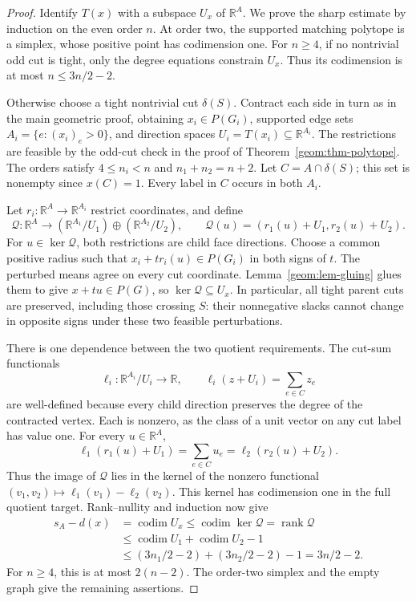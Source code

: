 \begin{proof}
Identify \(T(x)\) with a subspace \(U_x\) of \(\mathbb R^A\).
We prove the sharp estimate by induction on the even order \(n\).
At order two, the supported matching polytope is a simplex, whose
positive point has codimension one. For \(n\ge4\), if no nontrivial
odd cut is tight, only the degree equations constrain \(U_x\).
Thus its codimension is at most \(n\le3n/2-2\).

Otherwise choose a tight nontrivial cut \(\delta(S)\). Contract
each side in turn as in the main geometric proof, obtaining
\(x_i\in P(G_i)\), supported edge sets
\(A_i=\{e:(x_i)_e>0\}\), and direction spaces
\(U_i=T(x_i)\subseteq\mathbb R^{A_i}\). The restrictions are
feasible by the odd-cut check in the proof of
Theorem~\ref{geom:thm-polytope}. The orders satisfy
\(4\le n_i<n\) and \(n_1+n_2=n+2\).
Let \(C=A\cap\delta(S)\); this set is nonempty since \(x(C)=1\).
Every label in \(C\) occurs in both \(A_i\).

Let \(r_i:\mathbb R^A\to\mathbb R^{A_i}\) restrict coordinates,
and define
\begin{equation}\label{a:eq-quotient-map}
 \mathcal Q:\mathbb R^A\longrightarrow
  (\mathbb R^{A_1}/U_1)\oplus(\mathbb R^{A_2}/U_2),\qquad
 \mathcal Q(u)=(r_1(u)+U_1,r_2(u)+U_2).
\end{equation}
For \(u\in\ker\mathcal Q\), both restrictions are child face
directions. Choose a common positive radius such that
\(x_i+t r_i(u)\in P(G_i)\) in both signs of \(t\).
The perturbed means agree on every cut coordinate.
Lemma~\ref{geom:lem-gluing} glues them to give
\(x+tu\in P(G)\), so \(\ker\mathcal Q\subseteq U_x\).
In particular, all tight parent cuts are preserved, including those
crossing \(S\): their nonnegative slacks cannot change in opposite
signs under these two feasible perturbations.

There is one dependence between the two quotient requirements. The
cut-sum functionals
\[
 \ell_i:\mathbb R^{A_i}/U_i\longrightarrow\mathbb R,
 \qquad \ell_i(z+U_i)=\sum_{e\in C}z_e
\]
are well-defined because every child direction preserves the degree of
the contracted vertex. Each is nonzero, as the class of a unit vector
on any cut label has value one. For every \(u\in\mathbb R^A\),
\[
 \ell_1(r_1(u)+U_1)=\sum_{e\in C}u_e
                 =\ell_2(r_2(u)+U_2).
\]
Thus the image of \(\mathcal Q\) lies in the kernel of the nonzero
functional \((v_1,v_2)\mapsto\ell_1(v_1)-\ell_2(v_2)\).
This kernel has codimension one in the full quotient target.
Rank--nullity and induction now give
\begin{align*}
 s_A-d(x)&=\operatorname{codim}U_x
 \le\operatorname{codim}\ker\mathcal Q=\operatorname{rank}\mathcal Q\\
 &\le\operatorname{codim}U_1+\operatorname{codim}U_2-1\\
 &\le(3n_1/2-2)+(3n_2/2-2)-1=3n/2-2.
\end{align*}
For \(n\ge4\), this is at most \(2(n-2)\). The order-two
simplex and the empty graph give the remaining assertions.
\end{proof}


